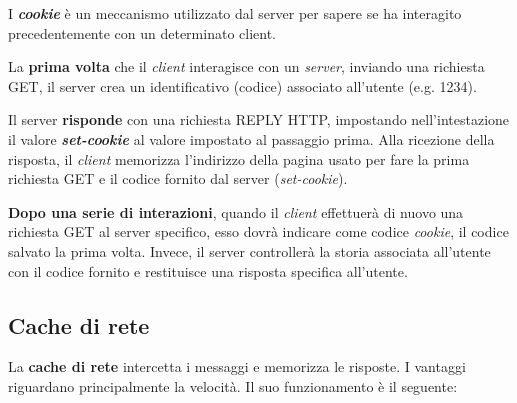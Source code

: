 \documentclass[a4paper]{article}
\begin{document}
	I \textcolor{Red3}{\textbf{\emph{cookie}}} è un meccanismo utilizzato dal server per sapere se ha interagito precedentemente con un determinato client.\newline
	
	\noindent
	La \textbf{prima volta} che il \emph{client} interagisce con un \emph{server}, inviando una richiesta GET, il server crea un identificativo (codice) associato all'utente (e.g. 1234).\newline
	
	\noindent
	Il server \textbf{risponde} con una richiesta REPLY HTTP, impostando nell'intestazione il valore \emph{\textbf{set-cookie}} al valore impostato al passaggio prima. Alla ricezione della risposta, il \emph{client} memorizza l'indirizzo della pagina usato per fare la prima richiesta GET e il codice fornito dal server (\emph{set-cookie}).\newline
	
	\noindent
	\textbf{Dopo una serie di interazioni}, quando il \emph{client} effettuerà di nuovo una richiesta GET al server specifico, esso dovrà indicare come codice \emph{cookie}, il codice salvato la prima volta. Invece, il server controllerà la storia associata all'utente con il codice fornito e restituisce una risposta specifica all'utente.
	
	\subsection{Cache di rete}
	
	La \textcolor{Red3}{\textbf{cache di rete}} intercetta i messaggi e memorizza le risposte. I vantaggi riguardano principalmente la velocità. Il suo funzionamento è il seguente:
	
\end{document}

